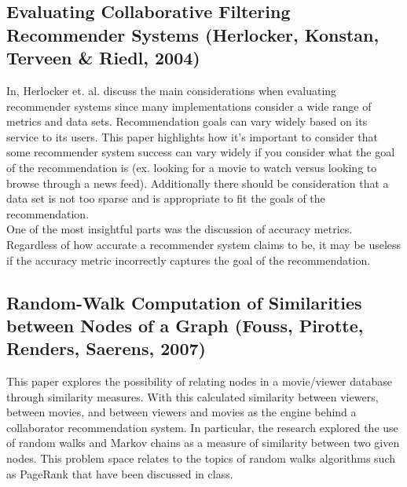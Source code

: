 \documentclass[10pt]{article}
\begin{document}
\subsection{Evaluating Collaborative Filtering Recommender Systems (Herlocker, Konstan, Terveen \& Riedl, 2004)}

In, Herlocker et. al. discuss the main considerations when evaluating recommender systems since many implementations consider a wide range of metrics and data sets. Recommendation goals can vary widely based on its service to its users. This paper highlights how it’s important to consider that some recommender system success can vary widely if you consider what the goal of the recommendation is (ex. looking for a movie to watch versus looking to browse through a news feed). Additionally there should be consideration that a data set is not too sparse and is appropriate to fit the goals of the recommendation. \\

One of the most insightful parts was the discussion of accuracy metrics. Regardless of how accurate a recommender system claims to be, it may be useless if the accuracy metric incorrectly captures the goal of the recommendation. 

\subsection{Random-Walk Computation of Similarities between Nodes of a Graph (Fouss, Pirotte, Renders, Saerens, 2007)}

This paper explores the possibility of relating nodes in a movie/viewer database through similarity measures. With this calculated similarity between viewers, between movies, and between viewers and movies as the engine behind a collaborator recommendation system. In particular, the research explored the use of random walks and Markov chains as a measure of similarity between two given nodes. This problem space relates to the topics of random walks algorithms such as PageRank that have been discussed in class. \\
\end{document}
